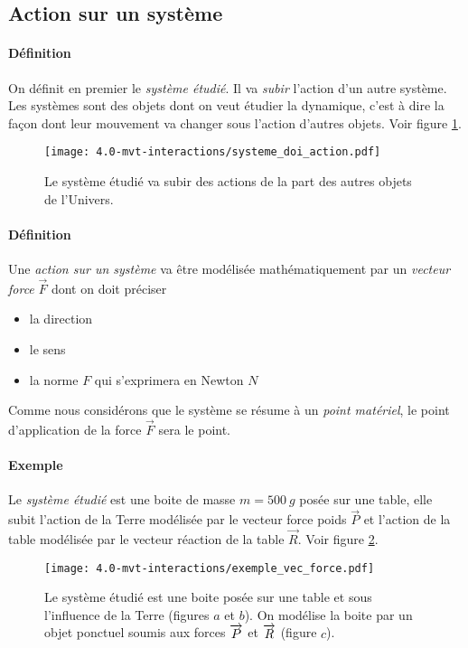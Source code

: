 \subsection{Action sur un système}
\paragraph{Définition} On définit en premier le \textit{système étudié}. Il va \textit{subir} l'action d'un autre système. Les systèmes sont des objets dont on veut étudier la dynamique, c'est à dire la façon dont leur mouvement va changer sous l'action d'autres objets. Voir figure \ref{fig:system_doi}.
\begin{figure}[h!]
  \begin{center}
      \texttt{[image: 4.0-mvt-interactions/systeme\_doi\_action.pdf]}
  \end{center}
  \caption{Le système étudié va subir des actions de la part des autres objets de l'Univers.}
  \label{fig:system_doi}
\end{figure}

\paragraph{Définition} Une \textit{action sur un système} va être modélisée mathématiquement par un
\textit{vecteur force} $\overrightarrow{F}$ dont on doit préciser
\begin{itemize}
 \item la direction
 \item le sens
 \item la norme $F$ qui s'exprimera en Newton $N$
\end{itemize}
Comme nous considérons que le système se résume à un \textit{point matériel}, le point d'application
de la force $\overrightarrow{F}$ sera le point.
\paragraph{Exemple} 
Le \textit{système étudié} est une boite de masse $m=500~g$ posée sur une table, elle subit l'action de la Terre modélisée par le vecteur force poids $\overrightarrow {P}$ et l'action de la table modélisée par le vecteur réaction de la table $\overrightarrow {R}$. 
Voir figure \ref{fig:exemple_vec_force}.
\begin{figure}[h!]
  \begin{center}
      \texttt{[image: 4.0-mvt-interactions/exemple\_vec\_force.pdf]}
  \end{center}
  \caption{Le système étudié est une boite posée sur une table et sous l'influence de la Terre (figures $a$ et $b$). On modélise la boite par un objet ponctuel soumis aux forces $\protect\overrightarrow{P}$ et $\protect\overrightarrow{R}$ (figure $c$).}
  \label{fig:exemple_vec_force}
\end{figure}

